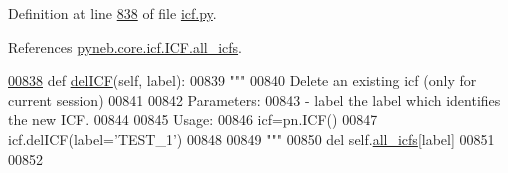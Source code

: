 Definition at line \hyperlink{icf_8py_source_l00838}{838} of file \hyperlink{icf_8py_source}{icf.\+py}.



References \hyperlink{icf_8py_source_l00023}{pyneb.\+core.\+icf.\+I\+C\+F.\+all\+\_\+icfs}.


\begin{DoxyCode}
\hypertarget{classpyneb_1_1core_1_1icf_1_1_i_c_f_l00838}{}\hyperlink{classpyneb_1_1core_1_1icf_1_1_i_c_f_a96966ef4b9dba4472c0d865b143b8240}{00838}     \textcolor{keyword}{def }\hyperlink{classpyneb_1_1core_1_1icf_1_1_i_c_f_a96966ef4b9dba4472c0d865b143b8240}{delICF}(self, label):
00839         \textcolor{stringliteral}{"""}
00840 \textcolor{stringliteral}{        Delete an existing icf (only for current session)}
00841 \textcolor{stringliteral}{        }
00842 \textcolor{stringliteral}{        Parameters:}
00843 \textcolor{stringliteral}{            - label    the label which identifies the new ICF. }
00844 \textcolor{stringliteral}{            }
00845 \textcolor{stringliteral}{        Usage:}
00846 \textcolor{stringliteral}{            icf=pn.ICF()}
00847 \textcolor{stringliteral}{            icf.delICF(label='TEST\_1')}
00848 \textcolor{stringliteral}{}
00849 \textcolor{stringliteral}{        """}
00850         del self.\hyperlink{classpyneb_1_1core_1_1icf_1_1_i_c_f_a854ee87a53feb102e429e902227ce88b}{all\_icfs}[label]
00851     
00852     
\end{DoxyCode}
\hypertarget{classpyneb_1_1core_1_1icf_1_1_i_c_f_a45f65185e75b6f98d08656c918385b38}{}

